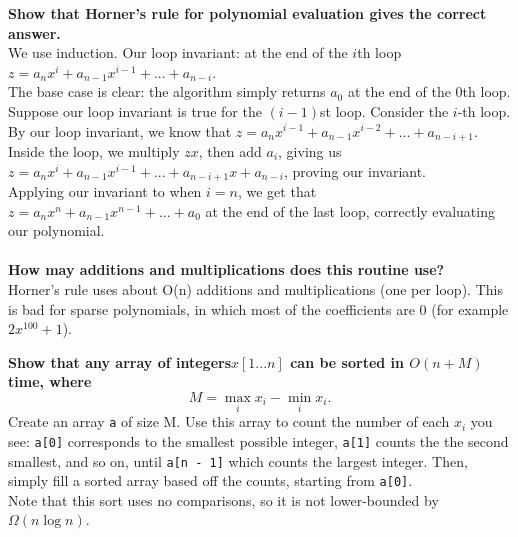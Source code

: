 \begin{problem}{2.29}
    \textbf{Show that Horner's rule for polynomial evaluation gives the correct answer.}
    \\
    We use induction. Our loop invariant: at the end of the $i$th loop 
    $z = a_nx^i + a_{n - 1}x^{i - 1} + ... + a_{n - i}$.
    \\
    The base case is clear: the algorithm simply returns $a_0$ at the end of the 0th loop.
    \\
    Suppose our loop invariant is true for the $(i - 1)$st loop. Consider the $i$-th loop. By our loop invariant, we know that $z = a_nx^{i - 1}+ a_{n - 1}x^{i - 2} + ... + a_{n - i + 1}$. Inside the loop, we multiply $zx$, then add $a_{i}$, giving us $z = a_nx^i + a_{n - 1}x^{i - 1} + ... + a_{n - i + 1}x + a_{n - i}$, proving our invariant.
    \\
    Applying our invariant to when $i = n$, we get that $z = a_nx^n + a_{n - 1}x^{n - 1} + ... + a_0$ at the end of the last loop, correctly evaluating our polynomial.
    \\ \\
    \textbf{How may additions and multiplications does this routine use?}
    \\
    Horner's rule uses about O(n) additions and multiplications (one per loop). This is bad for sparse polynomials, in which most of the coefficients are 0 (for example $2x^{100} + 1$).
\end{problem}

\begin{problem}{2.20}
\textbf{Show that any array of integers$x[1...n]$ can be sorted in $O(n + M)$ time, where}
    \[
    M = \max_i x_i - \min_i x_i.
    \]
    Create an array \texttt{a} of size M. Use this array to count the number of each $x_i$ you see: \texttt{a[0]} corresponds to the smallest possible integer, \texttt{a[1]} counts the the second smallest, and so on, until \texttt{a[n - 1]} which counts the largest integer. Then, simply fill a sorted array based off the counts, starting from \texttt{a[0]}.
    \\
    Note that this sort uses no comparisons, so it is not lower-bounded by $\Omega(n \log n)$.
\end{problem}
